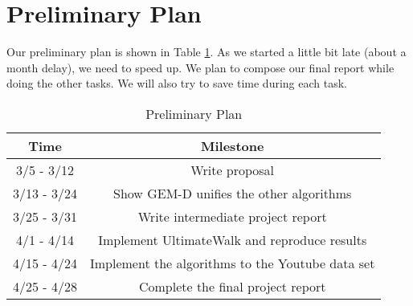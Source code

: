 \documentclass{sig-alternate-05-2015}
\begin{document}
\section{Preliminary Plan}
 Our preliminary plan is shown in Table \ref{tab:pp}. As we started a little bit late (about a month delay), we need to speed up. We plan to compose our final report while doing the other tasks. We will also try to save time during each task.
\begin{table}[!htp]
    \centering
    \begin{tabular}{|c|c|}
    \hline
       Time  &  Milestone\\
    \hline
       3/5 - 3/12& Write proposal \\
    \hline
    3/13 - 3/24 & Show GEM-D unifies the other algorithms \\
    \hline
    3/25 - 3/31 & Write intermediate project report\\
    \hline
    4/1 - 4/14 & Implement UltimateWalk and reproduce results\\
    \hline
    4/15 - 4/24 & Implement the algorithms to the Youtube data set\\
    \hline 
    4/25 - 4/28 & Complete the final project report\\
    \hline
    \end{tabular}
    \caption{Preliminary Plan}
    \label{tab:pp}
\end{table}



\end{document}
